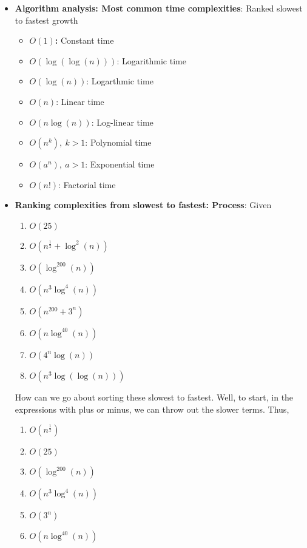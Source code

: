 \documentclass{report}
\begin{document}
\begin{itemize}
    \item \textbf{Algorithm analysis: Most common time complexities}: Ranked slowest to fastest growth
        \begin{itemize}
            \item \textbf{$O(1)$:} Constant time 
            \item \textbf{$O(\log(\log(n)))$}: Logarithmic time
            \item \textbf{$O(\log(n))$}: Logarthmic time
            \item \textbf{$O(n)$}: Linear time
            \item \textbf{$O(n\log(n))$}: Log-linear time
            \item \textbf{$O(n^{k}),\ k>1$}: Polynomial time
            \item \textbf{$O(a^{n}),\ a>1$}: Exponential time
            \item \textbf{$O(n!)$}: Factorial time
        \end{itemize}
    \item \textbf{Ranking complexities from slowest to fastest: Process}: Given 
        \begin{enumerate}[label=(\alph*)]
            \item $O(25) $
            \item $O(n^{\frac{1}{2}} + \log^{2}(n)) $
            \item $O(\log^{200}(n)) $
            \item $O(n^{3}\log^{4}(n)) $
            \item $O(n^{200} + 3^{n}) $
            \item $O(n\log^{40}(n)) $
            \item $O(4^{n}\log(n)) $
            \item $O(n^{3}\log(\log(n))) $
        \end{enumerate}
        How can we go about sorting these slowest to fastest. Well, to start, in the expressions with plus or minus, we can throw out the slower terms. Thus,
        \begin{enumerate}[label=(\alph*)]
            \item $O(n^{\frac{1}{2}}) $
            \item $O(25) $
            \item $O(\log^{200}(n)) $
            \item $O(n^{3}\log^{4}(n)) $
            \item $O(3^{n}) $
            \item $O(n\log^{40}(n)) $

\end{enumerate}
\end{itemize}
\end{document}
